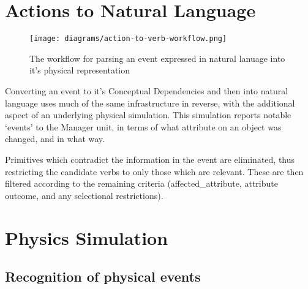 \documentclass{article}
\begin{document}
    \section{Actions to Natural Language}
    \begin{figure}[h]
        \begin{center}        
            \texttt{[image: diagrams/action-to-verb-workflow.png]}
        \end{center}
        \caption{The workflow for parsing an event expressed in natural lanuage into it's physical representation}
    \end{figure}

    Converting an event to it's Conceptual Dependencies and then into natural language uses much of the same infrastructure in reverse, with the additional aspect of an underlying physical simulation. This simulation reports notable `events' to the Manager unit, in terms of what attribute on an object was changed, and in what way.

    Primitives which contradict the information in the event are eliminated, thus restricting the candidate verbs to only those which are relevant. These are then filtered according to the remaining criteria (affected\_attribute, attribute outcome, and any selectional restrictions).

    \section{Physics Simulation}
    \subsection{Recognition of physical events}
\end{document}
